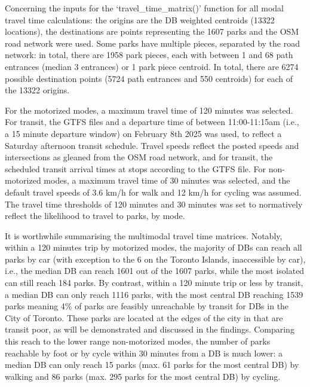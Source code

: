 \documentclass[
11pt, %
oneside, %
english, %
singlespacing, %
]{macthesis} %
\begin{document}
Concerning the inputs for the `travel\_time\_matrix()' function for all modal travel time calculations: the origins are the DB weighted centroids (13322 locations), the destinations are points representing the 1607 parks and the OSM road network were used. Some parks have multiple pieces, separated by the road network: in total, there are 1958 park pieces, each with between 1 and 68 path entrances (median 3 entrances) or 1 park piece centroid. In total, there are 6274 possible destination points (5724 path entrances and 550 centroids) for each of the 13322 origins.

For the motorized modes, a maximum travel time of 120 minutes was selected. For transit, the GTFS files and a departure time of between 11:00-11:15am (i.e., a 15 minute departure window) on February 8th 2025 was used, to reflect a Saturday afternoon transit schedule. Travel speeds reflect the posted speeds and intersections as gleaned from the OSM road network, and for transit, the scheduled transit arrival times at stops according to the GTFS file. For non-motorized modes, a maximum travel time of 30 minutes was selected, and the default travel speeds of 3.6 km/h for walk and 12 km/h for cycling was assumed. The travel time thresholds of 120 minutes and 30 minutes was set to normatively reflect the likelihood to travel to parks, by mode.

It is worthwhile summarising the multimodal travel time matrices. Notably, within a 120 minutes trip by motorized modes, the majority of DBs can reach all parks by car (with exception to the 6 on the Toronto Islands, inaccessible by car), i.e., the median DB can reach 1601 out of the 1607 parks, while the most isolated can still reach 184 parks. By contrast, within a 120 minute trip or less by transit, a median DB can only reach 1116 parks, with the most central DB reaching 1539 parks meaning 4\% of parks are feasibly unreachable by transit for DBs in the City of Toronto. These parks are located at the edges of the city in that are transit poor, as will be demonstrated and discussed in the findings. Comparing this reach to the lower range non-motorized modes, the number of parks reachable by foot or by cycle within 30 minutes from a DB is much lower: a median DB can only reach 15 parks (max. 61 parks for the most central DB) by walking and 86 parks (max. 295 parks for the most central DB) by cycling.
\end{document}
